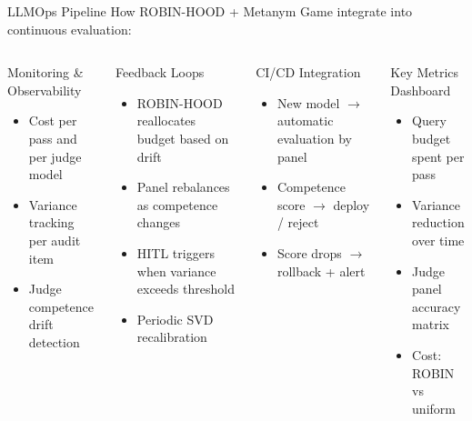 \documentclass[11pt, aspectratio=169]{beamer}
\begin{document}
\begin{frame}{LLMOps Pipeline}
  \centering
  How ROBIN-HOOD + Metanym Game integrate into continuous evaluation:

  \vspace{0.1cm}
  \footnotesize
  \begin{columns}[T]
      \begin{block}{Monitoring \& Observability}
        \begin{itemize}\scriptsize
          \item Cost per pass and per judge model
          \item Variance tracking per audit item
          \item Judge competence drift detection
        \end{itemize}
      \end{block}

      \vspace{0.1cm}
      \begin{block}{Feedback Loops}
        \begin{itemize}\scriptsize
          \item ROBIN-HOOD reallocates budget based on drift
          \item Panel rebalances as competence changes
          \item HITL triggers when variance exceeds threshold
          \item Periodic SVD recalibration
        \end{itemize}
      \end{block}

      \begin{block}{CI/CD Integration}
        \begin{itemize}\scriptsize
          \item New model $\rightarrow$ automatic evaluation by panel
          \item Competence score $\rightarrow$ deploy / reject
          \item Score drops $\rightarrow$ rollback + alert
        \end{itemize}
      \end{block}

      \vspace{0.1cm}
      \begin{block}{Key Metrics Dashboard}
        \begin{itemize}\scriptsize
          \item Query budget spent per pass
          \item Variance reduction over time
          \item Judge panel accuracy matrix
          \item Cost: ROBIN vs uniform
        \end{itemize}
      \end{block}
  \end{columns}
\end{frame}
\end{document}
